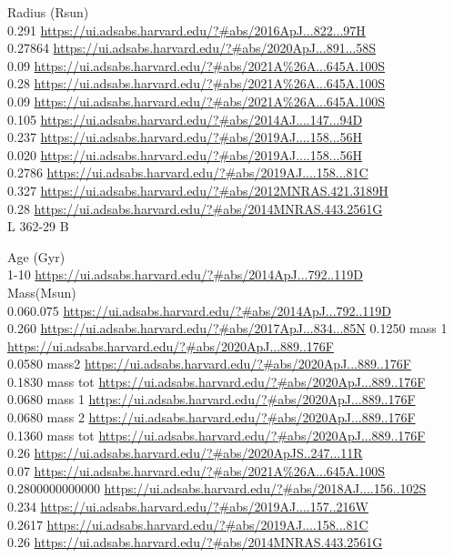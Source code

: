 Radius (Rsun)\\
0.291 \url{https://ui.adsabs.harvard.edu/?#abs/2016ApJ...822...97H}\\
0.27864 \url{https://ui.adsabs.harvard.edu/?#abs/2020ApJ...891...58S}\\
0.09 \url{https://ui.adsabs.harvard.edu/?#abs/2021A%26A...645A.100S}\\
0.28 \url{https://ui.adsabs.harvard.edu/?#abs/2021A%26A...645A.100S}\\
0.09 \url{https://ui.adsabs.harvard.edu/?#abs/2021A%26A...645A.100S}\\
0.105 \url{https://ui.adsabs.harvard.edu/?#abs/2014AJ....147...94D}\\
0.237 \url{https://ui.adsabs.harvard.edu/?#abs/2019AJ....158...56H}\\
0.020 \url{https://ui.adsabs.harvard.edu/?#abs/2019AJ....158...56H}\\
0.2786 \url{https://ui.adsabs.harvard.edu/?#abs/2019AJ....158...81C}\\
0.327 \url{https://ui.adsabs.harvard.edu/?#abs/2012MNRAS.421.3189H}\\
0.28 \url{https://ui.adsabs.harvard.edu/?#abs/2014MNRAS.443.2561G}\\

L 362-29 B

Age (Gyr)\\
1-10 \url{https://ui.adsabs.harvard.edu/?#abs/2014ApJ...792..119D}\\

Mass(Msun)\\
0.060.075	\url{https://ui.adsabs.harvard.edu/?#abs/2014ApJ...792..119D}\\
0.260 \url{https://ui.adsabs.harvard.edu/?#abs/2017ApJ...834...85N}
0.1250 mass 1 \url{https://ui.adsabs.harvard.edu/?#abs/2020ApJ...889..176F}\\
0.0580 mass2	\url{https://ui.adsabs.harvard.edu/?#abs/2020ApJ...889..176F}\\
0.1830 mass tot \url{https://ui.adsabs.harvard.edu/?#abs/2020ApJ...889..176F}\\
0.0680 mass 1 \url{https://ui.adsabs.harvard.edu/?#abs/2020ApJ...889..176F}\\
0.0680 mass 2 \url{https://ui.adsabs.harvard.edu/?#abs/2020ApJ...889..176F}\\
0.1360 mass tot \url{https://ui.adsabs.harvard.edu/?#abs/2020ApJ...889..176F}\\
0.26 \url{https://ui.adsabs.harvard.edu/?#abs/2020ApJS..247...11R}\\
0.07 \url{https://ui.adsabs.harvard.edu/?#abs/2021A%26A...645A.100S}\\
0.2800000000000 \url{https://ui.adsabs.harvard.edu/?#abs/2018AJ....156..102S}\\
0.234 \url{https://ui.adsabs.harvard.edu/?#abs/2019AJ....157..216W}\\
0.2617 \url{https://ui.adsabs.harvard.edu/?#abs/2019AJ....158...81C}\\
0.26 \url{https://ui.adsabs.harvard.edu/?#abs/2014MNRAS.443.2561G}\\

